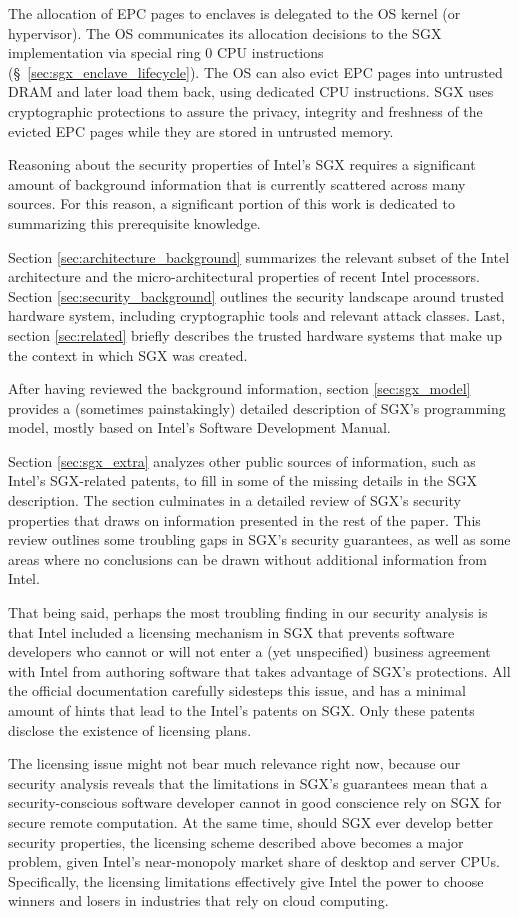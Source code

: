 The allocation of EPC pages to enclaves is delegated to the OS kernel (or
hypervisor). The OS communicates its allocation decisions to the SGX
implementation via special ring 0 CPU instructions
(\S~\ref{sec:sgx_enclave_lifecycle}). The OS can also evict EPC pages into
untrusted DRAM and later load them back, using dedicated CPU instructions. SGX
uses cryptographic protections to assure the privacy, integrity and freshness
of the evicted EPC pages while they are stored in untrusted memory.


\label{sec:intro_troubles}

Reasoning about the security properties of Intel's SGX requires a significant
amount of background information that is currently scattered across many
sources. For this reason, a significant portion of this work is dedicated to
summarizing this prerequisite knowledge.

Section \ref{sec:architecture_background} summarizes the relevant subset of the
Intel architecture and the micro-architectural properties of recent Intel
processors. Section \ref{sec:security_background} outlines the security
landscape around trusted hardware system, including cryptographic tools and
relevant attack classes. Last, section \ref{sec:related} briefly describes the
trusted hardware systems that make up the context in which SGX was created.

After having reviewed the background information, section \ref{sec:sgx_model}
provides a (sometimes painstakingly) detailed description of SGX's programming
model, mostly based on Intel's Software Development Manual.

Section \ref{sec:sgx_extra} analyzes other public sources of information, such
as Intel's SGX-related patents, to fill in some of the missing details in the
SGX description. The section culminates in a detailed review of SGX's security
properties that draws on information presented in the rest of the paper. This
review outlines some troubling gaps in SGX's security guarantees, as well as
some areas where no conclusions can be drawn without additional information
from Intel.

That being said, perhaps the most troubling finding in our security analysis is
that Intel included a licensing mechanism in SGX that prevents software
developers who cannot or will not enter a (yet unspecified) business agreement
with Intel from authoring software that takes advantage of SGX's protections.
All the official documentation carefully sidesteps this issue, and has a
minimal amount of hints that lead to the Intel's patents on SGX. Only these
patents disclose the existence of licensing plans.

The licensing issue might not bear much relevance right now, because our
security analysis reveals that the limitations in SGX's guarantees mean that a
security-conscious software developer cannot in good conscience rely on SGX for
secure remote computation. At the same time, should SGX ever develop better
security properties, the licensing scheme described above becomes a major
problem, given Intel's near-monopoly market share of desktop and server CPUs.
Specifically, the licensing limitations effectively give Intel the power to
choose winners and losers in industries that rely on cloud computing.
